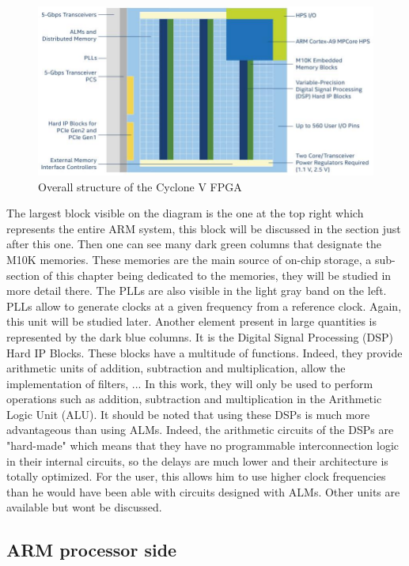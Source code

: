 \begin{figure}[H]
    \centering
    \includegraphics[scale=0.6]{Chapter1-Hardware/res/cycv_structure.PNG}
    \caption{Overall structure 
    of the Cyclone V FPGA}
    \label{fig:cyc5/structure}
\end{figure}

The largest block visible on the diagram is the one at the top right which represents the entire ARM
system, this block will be discussed in the section just after this one. Then one can see many dark 
green columns that designate the M10K memories. These memories are the main source of on-chip 
storage, a sub-section of this chapter being dedicated to the memories, they will be studied in more 
detail there. The PLLs are also visible in the light gray band on the left. PLLs allow to 
generate clocks at a given frequency from a reference clock. Again, this unit will be studied later. 
Another element present in large quantities is represented by the dark blue columns. It is the 
Digital Signal Processing (DSP) Hard IP Blocks. These blocks have a multitude of functions. Indeed, 
they provide arithmetic units of addition, subtraction and multiplication, allow the implementation 
of filters, ... In this work, they will only be used to perform operations such as addition, 
subtraction and multiplication in the Arithmetic Logic Unit (ALU). It should be noted that using 
these DSPs is much more advantageous than using ALMs. Indeed, the arithmetic circuits of the DSPs 
are "hard-made" which means that they have no programmable interconnection logic in their internal 
circuits, so the delays are much lower and their architecture is totally optimized. For the user, 
this allows him to use higher clock frequencies than he would have been able with circuits designed
with ALMs. Other units are available but wont be discussed.

\subsection{ARM processor side}

